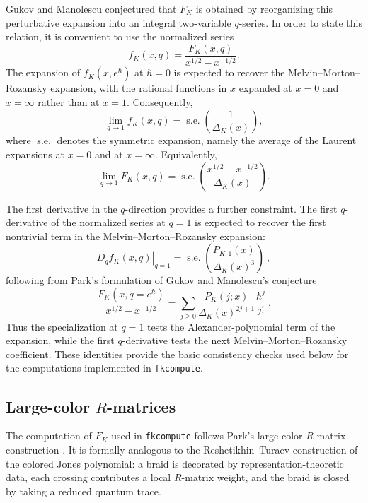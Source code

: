 \documentclass[twocolumn]{article}
\begin{document}
Gukov and Manolescu conjectured that $F_K$ is obtained by reorganizing this perturbative expansion into an integral two-variable $q$-series.
In order to state this relation, it is convenient to use the normalized series
\begin{equation}
    f_K(x,q)=\frac{F_K(x,q)}{x^{1/2}-x^{-1/2}}.
\end{equation}
The expansion of $f_K(x,e^\hbar)$ at $\hbar=0$ is expected to recover the Melvin--Morton--Rozansky expansion, with the rational functions in $x$ expanded at $x=0$ and $x=\infty$ rather than at $x=1$.
Consequently,
\begin{equation}\label{eq:q-one-limit-background}
  \lim_{q\to 1} f_K(x,q)
  =
  \operatorname{s.e.}\left(\frac{1}{\Delta_K(x)}\right),
\end{equation}
where $\operatorname{s.e.}$ denotes the symmetric expansion, namely the average of the Laurent expansions at $x=0$ and at $x=\infty$.
Equivalently,
\begin{equation}
  \lim_{q\to 1} F_K(x,q)
  =
  \operatorname{s.e.}\left(\frac{x^{1/2}-x^{-1/2}}{\Delta_K(x)}\right).
\end{equation}

The first derivative in the $q$-direction provides a further constraint.  
The first $q$-derivative of the normalized series at $q=1$ is expected to recover the first nontrivial term in the
Melvin--Morton--Rozansky expansion:
\begin{equation}\label{eq:q-derivative-background}
  \left. D_q f_K(x,q)\right|_{q=1}
  =
  \operatorname{s.e.}\left(\frac{P_{K,1}(x)}{\Delta_K(x)^3}\right)~,
\end{equation}
following from Park's formulation of Gukov and Manolescu's conjecture
\begin{equation}
  \frac{F_K(x,q=e^{\hbar})}{x^{1/2}-x^{-1/2}}=\sum_{j\geq 0}\frac{P_K(j;x)}{\Delta_{K}(x)^{2j+1}}\frac{\hbar^j}{j!}~.
\end{equation}
Thus the specialization at $q=1$ tests the Alexander-polynomial term of the expansion,
while the first $q$-derivative tests the next Melvin--Morton--Rozansky coefficient.  These
identities provide the basic consistency checks used below for the computations implemented
in \texttt{fkcompute}.


\subsection{Large-color $R$-matrices}

The computation of $F_K$ used in \texttt{fkcompute} follows Park's large-color
$R$-matrix construction \cite{Park20,Park21}.  It is formally analogous to the
Reshetikhin--Turaev construction of the colored Jones polynomial: a braid is
decorated by representation-theoretic data, each crossing contributes a local
$R$-matrix weight, and the braid is closed by taking a reduced quantum trace.
\end{document}
